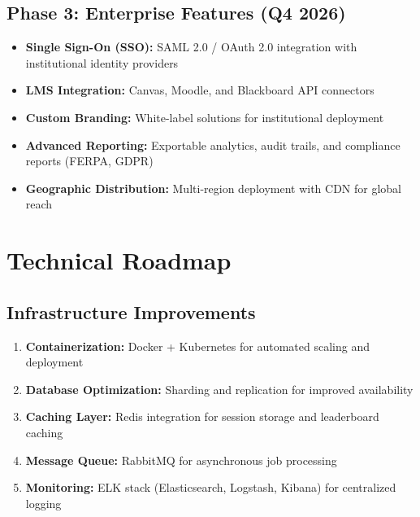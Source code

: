 \documentclass[12pt,a4paper]{report}
\begin{document}
\subsection{Phase 3: Enterprise Features (Q4 2026)}

\begin{itemize}[left=0pt]
  \item \textbf{Single Sign-On (SSO):} SAML 2.0 / OAuth 2.0 integration with institutional identity providers
  
  \item \textbf{LMS Integration:} Canvas, Moodle, and Blackboard API connectors
  
  \item \textbf{Custom Branding:} White-label solutions for institutional deployment
  
  \item \textbf{Advanced Reporting:} Exportable analytics, audit trails, and compliance reports (FERPA, GDPR)
  
  \item \textbf{Geographic Distribution:} Multi-region deployment with CDN for global reach
\end{itemize}

\section{Technical Roadmap}

\subsection{Infrastructure Improvements}

\begin{enumerate}[left=0pt]
  \item \textbf{Containerization:} Docker + Kubernetes for automated scaling and deployment
  
  \item \textbf{Database Optimization:} Sharding and replication for improved availability
  
  \item \textbf{Caching Layer:} Redis integration for session storage and leaderboard caching
  
  \item \textbf{Message Queue:} RabbitMQ for asynchronous job processing
  
  \item \textbf{Monitoring:} ELK stack (Elasticsearch, Logstash, Kibana) for centralized logging
\end{enumerate}
\end{document}
